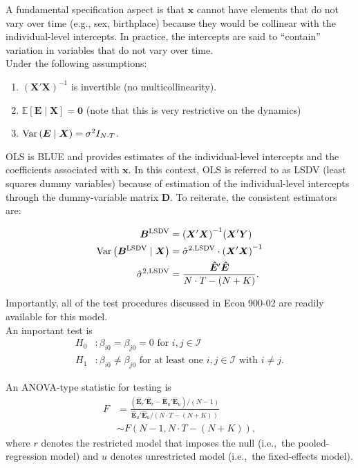 \noindent A fundamental specification aspect is that $\bm{x}$ cannot have elements that do not vary over time (e.g., sex, birthplace) because they would be collinear with the individual-level intercepts. In practice, the intercepts are said to ``contain'' variation in variables that do not vary over time.\\

\noindent Under the following assumptions: 
	\begin{enumerate}
		\item ${\left( \bm{X}' \bm{X} \right)}^{-1}$ is invertible (no multicollinearity).
		\item $\mathbb{E} \left[ \bm{E} \mid \bm{X} \right] = \bm{0}$ (note that this is very restrictive on the dynamics)
		\item $\operatorname{Var} \left( \bm{E} \mid \bm{X} \right) = \sigma^2 I_{N \cdot T}$. 
	\end{enumerate}

\noindent OLS is BLUE and provides estimates of the individual-level intercepts and the coefficients associated with $\bm{x}$. In this context, OLS is referred to as LSDV (least squares dummy variables) because of estimation of the individual-level intercepts through the dummy-variable matrix $\bm{D}$. To reiterate, the consistent estimators are: 

\begin{align}
	\bm{B}^{\text{LSDV}} & = {\left( \bm{X}' \bm{X} \right)}^{-1} {\left( \bm{X}' \bm{Y} \right)} \nonumber \\
	\operatorname{Var} \left( \bm{B}^{\text{LSDV}} \mid \bm{X} \right) & = \hat{\sigma}^{2,\text{LSDV}} \cdot {\left( \bm{X}' \bm{X} \right)}^{-1} \nonumber \\
	\hat{\sigma}^{2,\text{LSDV}} &= \frac{\bm{\hat{E}}'\bm{\hat{E}}}{ N\cdot T - \left( N + K \right) }.
\end{align}

\noindent Importantly, all of the test procedures discussed in Econ 900-02 are readily available for this model.\\

\noindent An important test is
\begin{align}
	H_0 & : \beta_{i0} = \beta_{j0} = 0 \nonumber \text{ for $i,j \in \mathcal{I}$}  \\
	H_1 & : \beta_{i0} \neq \beta_{j0} \text{ for at least one $i,j \in \mathcal{I}$ with $i \neq j$} \nonumber .
\end{align}

\noindent An ANOVA-type statistic for testing is
\begin{align}
	F & = \frac{ \left( \bm{\hat{E}}_r'\bm{\hat{E}}_r - \bm{\hat{E}}_u'\bm{\hat{E}}_u \right) / \left( N - 1\right) } { \bm{\hat{E}}_u'\bm{\hat{E}}_u / \left(N\cdot T - \left( N + K \right) \right) } \nonumber \\ 
	  & \sim F \left( N - 1, N\cdot T - \left( N + K \right) \right), 
\end{align}
\noindent where $r$ denotes the restricted model that imposes the null (i.e.,\ the pooled-regression model) and $u$ denotes unrestricted model (i.e.,\ the fixed-effects model).\\ 

